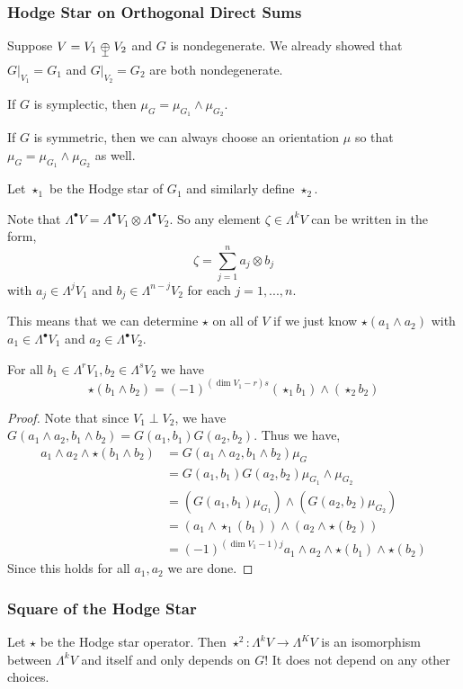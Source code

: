 \subsubsection{Hodge Star on Orthogonal Direct Sums}
Suppose $V = V_1\orthoplus V_2$ and $G$ is nondegenerate. We already showed that $G|_{V_1}=G_1$ and $G|_{V_2}=G_2$ are both nondegenerate.
\begin{remark*}
    If $G$ is symplectic, then $\mu_G = \mu_{G_1}\wedge \mu_{G_2}$.

    If $G$ is symmetric, then we can always choose an orientation $\mu$ so that $\mu_G = \mu_{G_1}\wedge \mu_{G_2}$ as well.
\end{remark*}
Let $\star_1$ be the Hodge star of $G_1$ and similarly define $\star_2$.
\begin{remark*}
    Note that $\Lambda^\bullet V = \Lambda^\bullet V_1 \otimes \Lambda^\bullet V_2$. So any element $\zeta\in\Lambda^k V$ can be written in the form,
    \[\zeta = \sum_{j=1}^n a_j \otimes b_j\]
    with $a_j \in \Lambda^j V_1$ and $b_j \in \Lambda^{n-j}V_2$ for each $j=1,...,n$.
\end{remark*}
This means that we can determine $\star$ on all of $V$ if we just know $\star(a_1\wedge a_2)$ with $a_1 \in \Lambda^\bullet V_1$ and $a_2 \in \Lambda^\bullet V_2$. 
\begin{thm}For all $b_1\in \Lambda^r V_1,b_2\in \Lambda^s V_2$ we have
\begin{equation}\star(b_1\wedge b_2) = (-1)^{(\dim V_1-r)s}(\star_1 b_1) \wedge (\star_2 b_2)\end{equation}
\end{thm}
\begin{proof}
Note that since $V_1\perp V_2$, we have $G(a_1\wedge a_2,b_1\wedge b_2) = G(a_1,b_1)G(a_2,b_2)$. Thus we have,
\begin{align*}
    a_1\wedge a_2\wedge\star(b_1\wedge b_2)&=G(a_1\wedge a_2,b_1\wedge b_2)\mu_G\\
    &= G(a_1,b_1)G(a_2,b_2)\mu_{G_1}\wedge\mu_{G_2}\\
    &=(G(a_1,b_1)\mu_{G_1})\wedge(G(a_2,b_2)\mu_{G_2})\\
    &= (a_1\wedge \star_1(b_1))\wedge (a_2\wedge\star(b_2))\\
    &= (-1)^{(\dim V_1 - 1)j}a_1\wedge a_2 \wedge \star(b_1)\wedge\star(b_2)
\end{align*}
Since this holds for all $a_1,a_2$ we are done.
\end{proof}
\subsubsection{Square of the Hodge Star}
\begin{remark*}
    Let $\star$ be the Hodge star operator. Then $\star^2 : \Lambda^k V \to \Lambda^K V$ is an isomorphism between $\Lambda^k V$ and itself and only depends on $G$! It does not 
    depend on any other choices.
\end{remark*}

